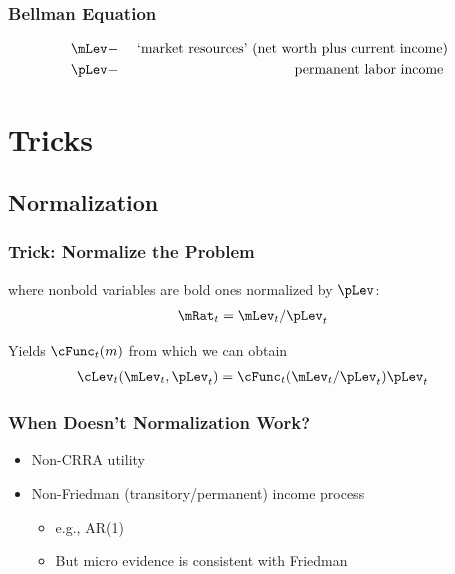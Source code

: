\documentclass{beamer}
\begin{document}
\begin{frame}[label=vrecurse]
\frametitle{\large\textbf{Bellman Equation}}



\begin{equation*}\begin{gathered}\begin{aligned}
   \mLev & - & \text{ `market resources' (net worth plus current income)}
\\ \pLev & - & \text{ permanent labor income }
\end{aligned}\end{gathered}\end{equation*}

\end{frame}

\section{Tricks}
\subsection{Normalization}
\begin{frame}[label=Normalize]
\frametitle{\large\textbf{Trick: Normalize the Problem}}



where nonbold variables are bold ones normalized by $\pLev$:
\begin{equation}\begin{gathered}\begin{aligned}
\mRat_{t}  & = \mLev_{t}/\pLev_{t}
\end{aligned}\end{gathered}\end{equation}

Yields $\cFunc_{t}(m)$ from which we can obtain
\begin{equation}\begin{gathered}\begin{aligned}
  \cLev_{t}(\mLev_{t},\pLev_{t})  & = \cFunc_{t}(\mLev_{t}/\pLev_{t})\pLev_{t}
\end{aligned}\end{gathered}\end{equation}

\end{frame}

\begin{frame}[label=Normalize]
\frametitle{\large\textbf{When Doesn't Normalization Work?}}

\begin{itemize}
\item Non-CRRA utility
\item Non-Friedman (transitory/permanent) income process
\begin{itemize}
\item e.g., AR(1)
\item But micro evidence is consistent with Friedman
\end{itemize}
\end{itemize}

\end{frame}
\end{document}
